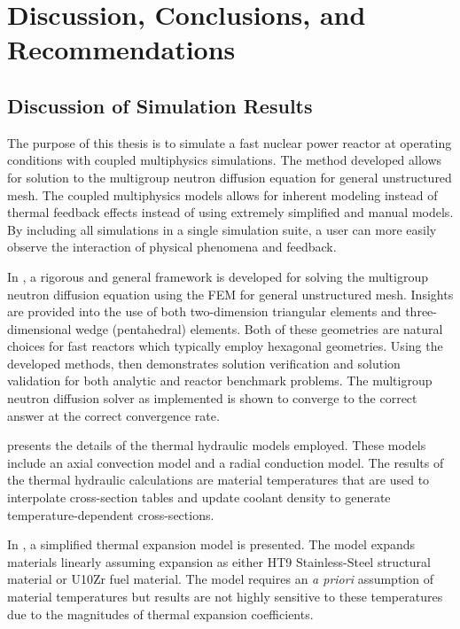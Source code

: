 \chapter{Discussion, Conclusions, and Recommendations}
\label{ch:conclusions}

\section{Discussion of Simulation Results}

  The purpose of this thesis is to simulate a fast nuclear power reactor at 
  operating conditions with coupled multiphysics simulations. The method
  developed allows for solution to the multigroup neutron diffusion equation for
  general unstructured mesh. The coupled multiphysics models allows for inherent
  modeling instead of thermal feedback effects instead of using extremely
  simplified and manual models. By including all simulations in a single
  simulation suite, a user can more easily observe the interaction of 
  physical phenomena and feedback.

  In , a rigorous and general framework is developed
  for solving the multigroup neutron diffusion equation using the FEM for
  general unstructured mesh. Insights are provided into the use of both
  two-dimension triangular elements and three-dimensional wedge (pentahedral)
  elements. Both of these geometries are natural choices for fast reactors which 
  typically employ hexagonal geometries. Using the developed methods,
   then demonstrates solution verification and
  solution validation for both analytic and reactor benchmark problems. The
  multigroup neutron diffusion solver as implemented is shown to converge to the
  correct answer at the correct convergence rate.

   presents the details of the thermal hydraulic
  models employed. These models include an axial convection model and a radial
  conduction model. The results of the thermal hydraulic calculations are
  material temperatures that are used to interpolate cross-section tables and
  update coolant density to generate temperature-dependent cross-sections.

  In , a simplified thermal expansion model is
  presented. The model expands materials linearly assuming expansion as either
  HT9 Stainless-Steel structural material or U10Zr fuel material. The model
  requires an \textit{a priori} assumption of material temperatures but results
  are not highly sensitive to these temperatures due to the magnitudes of
  thermal expansion coefficients.

